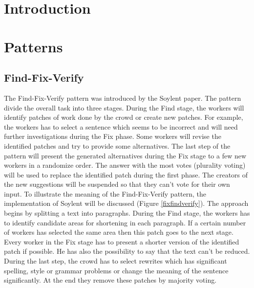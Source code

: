 \section{Introduction}

\section{Patterns}

\subsection{Find-Fix-Verify}
The Find-Fix-Verify pattern was introduced by the Soylent paper. The pattern divide the overall task into three stages. During the Find stage, the workers will identify patches of work done by the crowd or create new patches. For example, the workers has to select a sentence which seems to be incorrect and will need further investigations during the Fix phase. Some workers will revise the identified patches and try to provide some alternatives. The last step of the pattern will present the generated alternatives during the Fix stage to a few new workers in a randomize order. The answer with the most votes (plurality voting) will be used to replace the identified patch during the first phase. The creators of the new suggestions will be suspended so that they can't vote for their own input. To illustrate the meaning of the Find-Fix-Verify pattern, the implementation of Soylent will be discussed (Figure \ref{fixfindverify}). The approach begins by splitting a text into paragraphs. During the Find stage, the workers has to identify candidate areas for shortening in each paragraph. If a certain number of workers has selected the same area then this patch goes to the next stage. Every worker in the Fix stage has to present a shorter version of the identified patch if possible. He has also the possibility to say that the text can't be reduced. During the last step, the crowd has to select rewrites which has significant spelling, style or grammar problems or change the meaning of the sentence significantly. At the end they remove these patches by majority voting.
